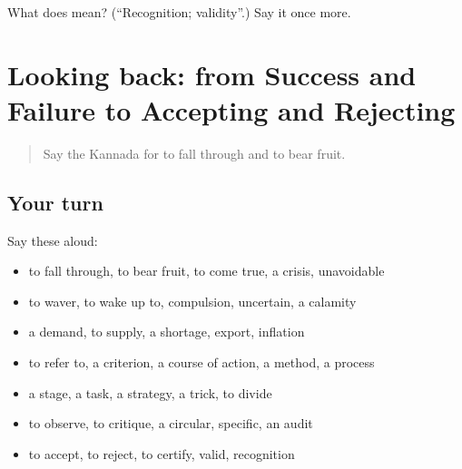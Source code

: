\begin{tcolorbox}[breakable,colback=teal!4,colframe=teal!35!black,title={Before you move on}]
What does  mean? (\textquotedblleft{}Recognition; validity\textquotedblright{}.) Say it once more.
\end{tcolorbox}
\section[(dialogue)]{Looking back: from Success and Failure to Accepting and Rejecting}

\label{lesson:KA-R425-review-419-425}



\begin{quote}
Say the Kannada for to fall through and to bear fruit.
\end{quote}

\subsection*{Your turn}
Say these aloud:

\begin{itemize}
\raggedright
  \item to fall through, to bear fruit, to come true, a crisis, unavoidable
  \item to waver, to wake up to, compulsion, uncertain, a calamity
  \item a demand, to supply, a shortage, export, inflation
  \item to refer to, a criterion, a course of action, a method, a process
  \item a stage, a task, a strategy, a trick, to divide
  \item to observe, to critique, a circular, specific, an audit
  \item to accept, to reject, to certify, valid, recognition
\end{itemize}

